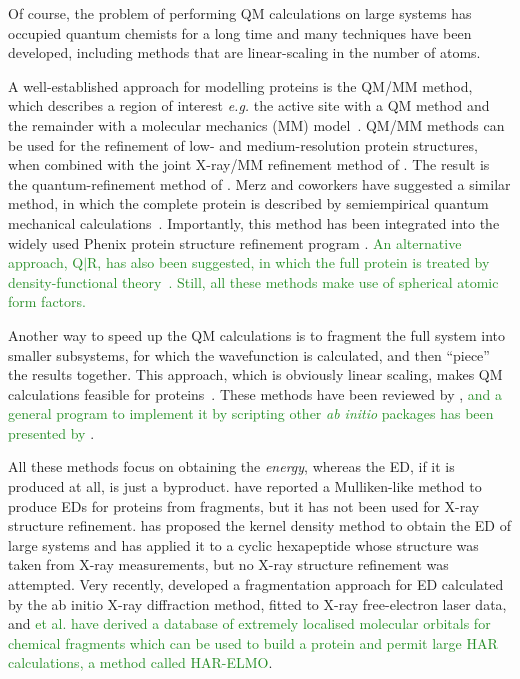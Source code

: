 \documentclass[preprint,dvipsnames]{iucr}              %
\newcommand{\changed}[1]{\textcolor{ForestGreen}{#1}}
\begin{document}
Of course, the
problem of performing QM calculations on large systems 
has occupied quantum chemists for a long time and
many techniques have been developed, including methods 
that are linear-scaling in the number of atoms.



A well-established approach for modelling proteins is the QM/MM method, 
which describes a region of interest {\em e.g.} the active site with a 
QM method and the remainder 
with a molecular 
mechanics (MM) model~\cite{warshel1976theoretical,singh1986combined,
Thiel:09,Ryde:qmmmrev}.  QM/MM methods can be used 
for the refinement of low- and medium-resolution protein structures, when combined with the joint X-ray/MM refinement 
method of . The result is the 
quantum-refinement method of . 
Merz and coworkers have suggested a similar method, in which the complete protein is described by
semiempirical quantum mechanical calculations~\cite{Merz:05}. Importantly, this
method has been integrated into the widely used Phenix protein structure 
refinement program \cite{borbulevych2014accurate}.  
\changed{An alternative approach,  Q$\vert$R, has also been suggested, 
in which the full protein is treated by density-functional 
theory~\cite{zheng2017q}. Still, all these methods 
make use of spherical atomic form factors.}

Another way to speed up the QM calculations is to fragment the full 
system into smaller subsystems, for which the wavefunction is calculated, 
and then ``piece'' the results together. This approach, which is obviously 
linear scaling, makes QM calculations feasible for 
proteins~\cite{stoll1992correlation,doll1997quantum,zhang2003molecular,soderhjelm2008accurate,%
yang1991direct,lee1996linear,yang1995density,kohn1996density,%
dixon1996semiempirical,gogonea2000quantum,stewart1996application,%
daniels1997semiempirical,daniels1999best,scuseria1999linear}.
These methods have been reviewed by ,
\changed{and a general program to implement it by scripting other
{\em ab initio} packages has been presented by \citeasnoun{Kobayashi2019}}.

All these methods focus on obtaining the {\em energy}, whereas
the ED, if it is produced at all, is just a byproduct. 
 have reported 
a Mulliken-like method to produce EDs for proteins
from fragments, but it has not been used for X-ray structure 
refinement.  has proposed the
kernel density method to obtain the ED of large systems 
and has applied it to a cyclic hexapeptide whose structure 
was taken from X-ray measurements, 
but no  X-ray structure refinement was attempted.
Very recently,  developed a 
fragmentation approach for ED calculated by the ab initio X-ray 
diffraction method, fitted to X-ray free-electron laser data,
and \changed{ et al.
have derived a database of extremely localised molecular
orbitals for chemical fragments which can be used
to build a protein and permit large HAR calculations, a method
called HAR-ELMO}.
\end{document}
